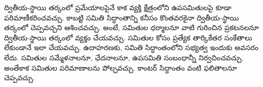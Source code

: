 \documentclass[../../../include/open-logic-section]{subfiles}
\begin{document}


ద్వితీయ-స్థాయి తర్కంలో ప్రమేయాలపైనే కాక వ్యక్తి క్షేత్రంలోని ఉపసమితులపై
కూడా పరిమాణీకరించవచ్చు. కాబట్టి సమితి సిద్ధాంతాన్ని కనీసం కొంతవరకైనా
ద్వితీయ-స్థాయి తర్కంలో చెప్పవచ్చని ఆశించవచ్చు. అంటే, సమితుల ధర్మాలనూ
వాటి గురించిన ప్రకటనలనూ ద్వితీయ-స్థాయి తర్కంలో వ్యక్తం చేయవచ్చు.
సమితుల కోసం ప్రత్యేక తార్కికేతర సంకేతాలు లేకుండానే ఇలా చేయవచ్చు.
ఉదాహరణకు, సమితి సిద్ధాంతంలోని సభ్యత్వ  ఇందుకు అవసరం లేదు.
సమితుల సమ్మేళనాలనూ, ఛేదనాలనూ, ఉపసమితి సంబంధాన్నీ
నిర్వచించవచ్చు. అంతేకాక సమితుల పరిమాణాలను పోల్చవచ్చు. కాంటర్ సిద్ధాంతం
వంటి ఫలితాలనూ చెప్పవచ్చు.
\end{document}
